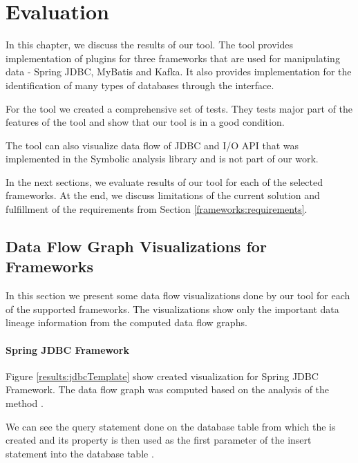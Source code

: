 
\chapter{Evaluation \label{chapter:results}}

In this chapter, we discuss the results of our \ToolName tool.
The tool provides implementation of plugins for three frameworks
that are used for manipulating data - Spring JDBC, MyBatis and Kafka.
It also provides implementation for the identification of many types of databases
through the  interface.

For the \ToolName tool we created a comprehensive set of tests.
They tests major part of the features of the tool and show
that our tool is in a good condition.

The \ToolName tool can also visualize data flow of JDBC and I/O API that was
implemented in the Symbolic analysis library and is not part of our work.

In the next sections, we evaluate results of our \ToolName tool for each of the selected frameworks.
At the end, we discuss limitations of the current solution and fulfillment of
the requirements from Section \ref{frameworks:requirements}.




\section{Data Flow Graph Visualizations for Frameworks}

In this section we present some data flow visualizations done by our \ToolName tool
for each of the supported frameworks. The visualizations show only
the important data lineage information from the computed data flow graphs.



\subsubsection{Spring JDBC Framework}

Figure \ref{results:jdbcTemplate} show created visualization for Spring JDBC Framework.
The data flow graph was computed based on the analysis of the method\break
{}.

We can see the query statement done on the database table 
from which the  is created and its
property  is then used as the first parameter of the insert statement
into the database table .



